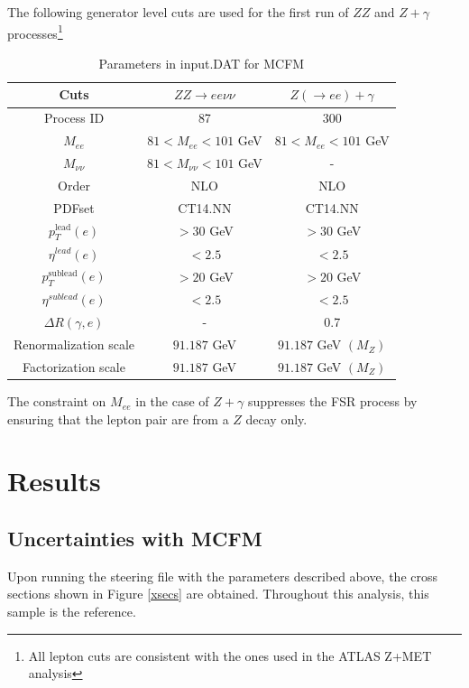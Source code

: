 \documentclass[11pt,a4paper,final]{report}
\begin{document}
The following generator level cuts are used for the first run of $ZZ$ and $Z+\gamma$ processes\footnote{All lepton cuts are consistent with the ones used in the ATLAS Z+MET analysis}
\begin{table}[H]
\begin{center}
	\begin{tabular}{|c|c|c|}
	\hline
	\textbf{Cuts} &$ZZ \rightarrow ee\nu\nu$ & $Z(\rightarrow ee)+\gamma$\\
	\hline
	Process ID & 87 & 300\\
	$M_{ee}$ & $81 < M_{ee} < 101$ GeV & $81 < M_{ee} < 101$ GeV\\
	$M_{\nu\nu}$ & $81 < M_{\nu\nu} < 101$ GeV& -\\
	Order & NLO & NLO\\
	PDFset & CT14.NN & CT14.NN\\
	$p_T^{\text{lead}}(e)$ & $> 30$ GeV & $> 30$ GeV\\
	$\eta^{lead}(e)$ & $< 2.5$ & $< 2.5$\\
	$p_T^{\text{sublead}}(e)$ & $> 20$ GeV & $> 20$ GeV\\
	$\eta^{sublead}(e)$ & $< 2.5$ & $< 2.5$\\
	$\Delta R(\gamma,e)$ & - & 0.7\\
	Renormalization scale & $91.187$ GeV & $91.187$ GeV $(M_{Z})$\\
	Factorization scale & $91.187$ GeV & $91.187$ GeV $(M_{Z})$\\
	\hline
	\end{tabular}
	\caption{Parameters in input.DAT for MCFM}
	\label{table:default}
	\end{center}
\end{table}

The constraint on $M_{ee}$ in the case of $Z+\gamma$ suppresses the FSR process by ensuring that the lepton pair are from a $Z$ decay only.

\section{Results}

\subsection*{Uncertainties with MCFM}
\label{subsec:MCFM_unc}
\setcounter{subsection}{1}
Upon running the steering file with the parameters described above, the cross sections shown in Figure \ref{xsecs} are obtained. Throughout this analysis, this sample is the reference.
\end{document}
